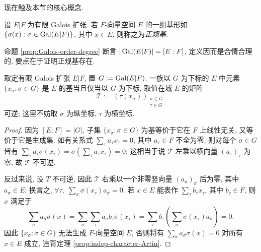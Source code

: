 现在触及本节的核心概念.
\begin{definition}
	设 $E|F$ 为有限 Galois 扩张. 若 $F$-向量空间 $E$ 的一组基形如 $\{\sigma(x) : \sigma \in \operatorname{Gal}(E|F) \}$, 其中 $x \in E$, 则称之为\emph{正规基}.
\end{definition}
命题 \ref{prop:Galois-order-degree} 断言 $|\operatorname{Gal}(E|F)| = [E:F]$, 定义因而是合情合理的, 要点在于证明正规基存在.

\begin{lemma}
	取定有限 Galois 扩张 $E|F$, 置 $G := \operatorname{Gal}(E|F)$. 一族以 $G$ 为下标的 $E$ 中元素 $\{x_\sigma : \sigma \in G \}$ 是 $E$ 的基当且仅当以 $G$ 为下标, 取值在域 $E$ 的矩阵
	\[ \mathcal{T} := (\tau(x_\sigma))_{\substack{\sigma \in G \\ \tau \in G}} \]
	可逆; 这里不妨取 $\sigma$ 为纵坐标, $\tau$ 为横坐标.
\end{lemma}
\begin{proof}
	因为 $[E:F]=|G|$, 子集 $\{ x_\sigma : \sigma \in G \}$ 为基等价于它在 $F$ 上线性无关, 又等价于它是生成集. 如有关系式 $\sum_\tau a_\tau x_\tau = 0$, 其中 $a_\tau \in F$ 不全为零, 则对每个 $\sigma \in G$ 皆有 $\sum_\tau a_\tau \sigma(x_\tau) = \sigma\left( \sum_\tau a_\tau x_\tau \right) = 0$; 这相当于说 $\mathcal{T}$ 左乘以横向量 $(a_\tau)_\tau$ 为零, 故 $\mathcal{T}$ 不可逆.
	
	反过来说, 设 $T$ 不可逆, 因此 $\mathcal{T}$ 右乘以一个非零竖向量 $(a_\sigma)_\sigma$ 后为零, 其中 $a_\sigma \in E$; 换言之, $\forall \tau, \; \sum_\sigma \sigma(x_\tau) a_\sigma = 0$. 若 $x \in E$ 能表作 $\sum_\tau b_\tau x_\tau$, 其中 $b_\tau \in F$, 则 $x$ 满足于
	\[ \sum_\sigma a_\sigma \sigma(x) = \sum_\sigma \sum_\tau a_\sigma b_\tau \sigma(x_\tau) = \sum_\tau b_\tau \left( \sum_\sigma \sigma(x_\tau) a_\sigma \right) = 0. \]
	因此 $\{x_\sigma: \sigma \in G\}$ 无法生成 $F$-向量空间 $E$, 否则将有 $\sum_\sigma a_\sigma \sigma(x) = 0$ 对所有 $x \in E$ 成立, 违背定理 \ref{prop:indep-character-Artin}.
\end{proof}


